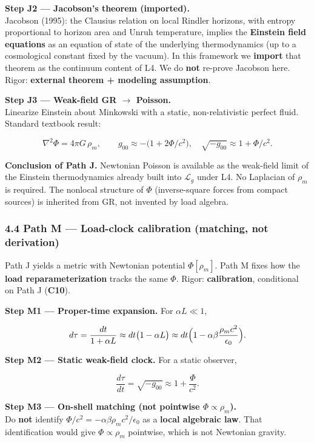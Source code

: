 \documentclass[
  11pt,
]{article}
\begin{document}
\textbf{Step J2 --- Jacobson's theorem (imported).}\\
Jacobson (1995): the Clausius relation on local Rindler horizons, with entropy proportional to horizon area and Unruh temperature, implies the \textbf{Einstein field equations} as an equation of state of the underlying thermodynamics (up to a cosmological constant fixed by the vacuum). In this framework we \textbf{import} that theorem as the continuum content of L4. We do \textbf{not} re-prove Jacobson here. Rigor: \textbf{external theorem + modeling assumption}.

\textbf{Step J3 --- Weak-field GR $\rightarrow$ Poisson.}\\
Linearize Einstein about Minkowski with a static, non-relativistic perfect fluid. Standard textbook result:

\[
\nabla^2\Phi = 4\pi G\,\rho_m,
\qquad
g_{00} \approx -\bigl(1+2\Phi/c^2\bigr),
\quad
\sqrt{-g_{00}}\approx 1+\Phi/c^2.
\]

\textbf{Conclusion of Path J.} Newtonian Poisson is available as the weak-field limit of the Einstein thermodynamics already built into \(\mathcal{L}_g\) under L4. No Laplacian of \(\rho_m\) is required. The nonlocal structure of \(\Phi\) (inverse-square forces from compact sources) is inherited from GR, not invented by load algebra.

\subsubsection{4.4 Path M --- Load-clock calibration (matching, not derivation)}\label{path-m-load-clock-calibration-matching-not-derivation}

Path J yields a metric with Newtonian potential \(\Phi[\rho_m]\). Path M fixes how the \textbf{load reparameterization} tracks the same \(\Phi\). Rigor: \textbf{calibration}, conditional on Path J (\textbf{C10}).

\textbf{Step M1 --- Proper-time expansion.} For \(\alpha L\ll 1\),

\[
d\tau
=
\frac{dt}{1+\alpha L}
\approx
dt\bigl(1-\alpha L\bigr)
\approx
dt\Bigl(1-\alpha\beta\frac{\rho_m c^2}{\epsilon_0}\Bigr).
\]

\textbf{Step M2 --- Static weak-field clock.} For a static observer,

\[
\frac{d\tau}{dt}
=
\sqrt{-g_{00}}
\approx
1+\frac{\Phi}{c^2}.
\]

\textbf{Step M3 --- On-shell matching (not pointwise \(\Phi\propto\rho_m\)).}\\
Do \textbf{not} identify \(\Phi/c^2=-\alpha\beta\rho_m c^2/\epsilon_0\) as a \textbf{local algebraic law}. That identification would give \(\Phi\propto\rho_m\) pointwise, which is not Newtonian gravity.
\end{document}

